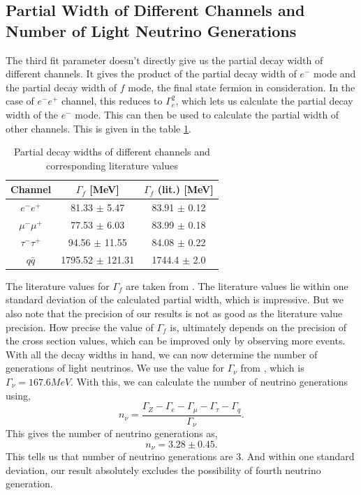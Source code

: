 \subsection{Partial Width of Different Channels and Number of Light Neutrino Generations}
The third fit parameter doesn't directly give us the partial decay width of different channels. It gives the product of the partial decay width of $e^-$ mode and the partial decay width of $f$ mode, the final state fermion in consideration. In the case of $e^-e^+$ channel, this reduces to $\Gamma_e^2$, which lets us calculate the partial decay width of the $e^-$ mode. This can then be used to calculate the partial width of other channels. This is given in the table \ref{table:decaywidth}.\\
\begin{table}[h!]
\centering
\begin{tabular}{c|cc}
\hline
Channel        & $\Gamma_f$ {[}MeV{]} & $\Gamma_f$ (lit.) {[}MeV{]} \\ \hline
$e^-e^+$       & 81.33 $\pm$ 5.47     & 83.91 $\pm$ 0.12              \\
$\mu^-\mu^+$   & 77.53 $\pm$ 6.03     & 83.99 $\pm$ 0.18              \\
$\tau^-\tau^+$ & 94.56 $\pm$ 11.55    & 84.08 $\pm$ 0.22              \\
$q\bar{q}$     & 1795.52 $\pm$ 121.31 & 1744.4 $\pm$ 2.0              \\ \hline
\end{tabular}
\caption{Partial decay widths of different channels and corresponding literature values}
\label{table:decaywidth}
\end{table}
The literature values for $\Gamma_f$ are taken from \cite{pdg2}. The literature values lie within one standard deviation of the calculated partial width, which is impressive. But we also note that the precision of our results is not as good as the literature value precision. How precise the value of $\Gamma_f$ is, ultimately depends on the precision of the cross section values, which can be improved only by observing more events.\\
With all the decay widths in hand, we can now determine the number of generations of light neutrinos. We use the value for $\Gamma_{\nu}$ from \cite{UB}, which is $\Gamma_{\nu} = 167.6 MeV$. With this, we can calculate the number of neutrino generations using,
\begin{equation}
    n_{\nu} = \frac{\Gamma_Z - \Gamma_e - \Gamma_{\mu} - \Gamma_{\tau} - \Gamma_q}{\Gamma_{\nu}}.
\end{equation}
This gives the number of neutrino generations as,
\begin{equation}
    n_{\nu} = 3.28 \pm 0.45.
\end{equation}
This tells us that number of neutrino generations are $3$. And within one standard deviation, our result absolutely excludes the possibility of fourth neutrino generation.

